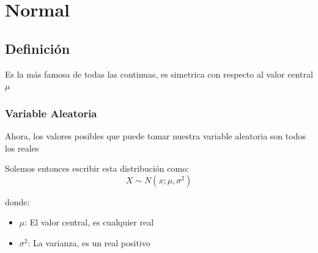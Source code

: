 \documentclass[12pt, fleqn]{report}                             %
\theoremstyle{break}                                            %
\begin{document}
        \clearpage
        \section{Normal}            
                    
 
            \subsection{Definición}

                Es la más famosa de todas las continuas, es simetrica con respecto al valor
                central $\mu$


                \vspace{1em}
                \subsubsection{Variable Aleatoria}

                    Ahora, los valores posibles que puede tomar nuestra variable aleatoria
                    son todos los reales

                    Solemos entonces escribir esta distribución como:
                    \begin{equation*}
                        X \sim N(x; \mu, \sigma^2)
                    \end{equation*}

                    donde:
                    \begin{itemize}
                        \item $\mu$: El valor central, es cualquier real
                        \item $\sigma^2$: La varianza, es un real positivo
                    \end{itemize}
\end{document}
